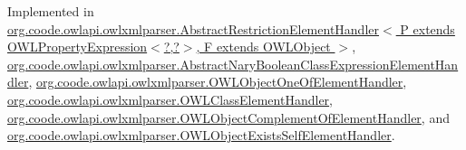 Implemented in \hyperlink{classorg_1_1coode_1_1owlapi_1_1owlxmlparser_1_1_abstract_restriction_element_handler_3_01_p_01ex1af432a427073023608ad4746636c054_ae26466d999d400cf13df2103cfc57f97}{org.\-coode.\-owlapi.\-owlxmlparser.\-Abstract\-Restriction\-Element\-Handler$<$ P extends O\-W\-L\-Property\-Expression$<$?,?$>$, F extends O\-W\-L\-Object $>$}, \hyperlink{classorg_1_1coode_1_1owlapi_1_1owlxmlparser_1_1_abstract_nary_boolean_class_expression_element_handler_a21b6b5a5de210dbe8db1bc7953b35053}{org.\-coode.\-owlapi.\-owlxmlparser.\-Abstract\-Nary\-Boolean\-Class\-Expression\-Element\-Handler}, \hyperlink{classorg_1_1coode_1_1owlapi_1_1owlxmlparser_1_1_o_w_l_object_one_of_element_handler_a527501bbe75bc48f2ffb5d1b477296cc}{org.\-coode.\-owlapi.\-owlxmlparser.\-O\-W\-L\-Object\-One\-Of\-Element\-Handler}, \hyperlink{classorg_1_1coode_1_1owlapi_1_1owlxmlparser_1_1_o_w_l_class_element_handler_a2d51a5e527288cee52661f02aa8b877d}{org.\-coode.\-owlapi.\-owlxmlparser.\-O\-W\-L\-Class\-Element\-Handler}, \hyperlink{classorg_1_1coode_1_1owlapi_1_1owlxmlparser_1_1_o_w_l_object_complement_of_element_handler_a72834d2137220df8bd63fb695d5c722a}{org.\-coode.\-owlapi.\-owlxmlparser.\-O\-W\-L\-Object\-Complement\-Of\-Element\-Handler}, and \hyperlink{classorg_1_1coode_1_1owlapi_1_1owlxmlparser_1_1_o_w_l_object_exists_self_element_handler_ad8698ce5e2b945734714d4dbbfeecab7}{org.\-coode.\-owlapi.\-owlxmlparser.\-O\-W\-L\-Object\-Exists\-Self\-Element\-Handler}.

